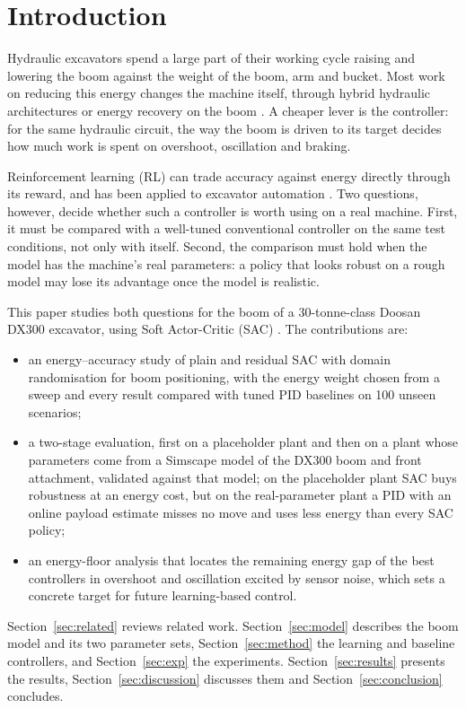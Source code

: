 \section{Introduction}
\label{sec:intro}

Hydraulic excavators spend a large part of their working cycle raising and lowering the boom
against the weight of the boom, arm and bucket. Most work on reducing this energy changes the
machine itself, through hybrid hydraulic architectures or energy recovery on the boom
\cite{casoli_hydraulic_2016,li_novel_2020}. A cheaper lever is the controller: for the same
hydraulic circuit, the way the boom is driven to its target decides how much work is spent on
overshoot, oscillation and braking.

Reinforcement learning (RL) can trade accuracy against energy directly through its reward, and
has been applied to excavator automation \cite{kurinov2020excavator,egli2022excavator}.
Two questions, however, decide whether such a controller is worth using on a real machine.
First, it must be compared with a well-tuned conventional controller on the same test
conditions, not only with itself. Second, the comparison must hold when the model has the
machine's real parameters: a policy that looks robust on a rough model may lose its advantage
once the model is realistic.

This paper studies both questions for the boom of a 30-tonne-class Doosan DX300 excavator, using
Soft Actor-Critic (SAC) \cite{haarnoja2018sac}. The contributions are:
\begin{itemize}
\item an energy--accuracy study of plain and residual SAC with domain randomisation for boom
positioning, with the energy weight chosen from a sweep and every result compared with tuned PID
baselines on 100 unseen scenarios;
\item a two-stage evaluation, first on a placeholder plant and then on a plant whose parameters
come from a Simscape model of the DX300 boom and front attachment, validated against that
model; on the placeholder plant SAC buys robustness at an energy cost, but on the real-parameter
plant a PID with an online payload estimate misses no move and uses less energy than every SAC
policy;
\item an energy-floor analysis that locates the remaining energy gap of the best controllers in
overshoot and oscillation excited by sensor noise, which sets a concrete target for future
learning-based control.
\end{itemize}

Section~\ref{sec:related} reviews related work. Section~\ref{sec:model} describes the boom model
and its two parameter sets, Section~\ref{sec:method} the learning and baseline controllers, and
Section~\ref{sec:exp} the experiments. Section~\ref{sec:results} presents the results,
Section~\ref{sec:discussion} discusses them and Section~\ref{sec:conclusion} concludes.
